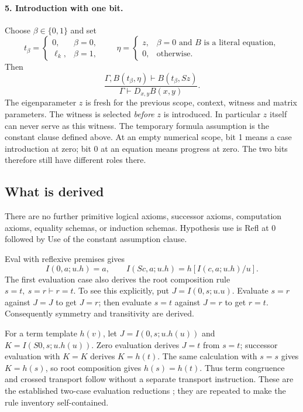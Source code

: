 \documentclass[11pt,letterpaper]{article}
\theoremstyle{definition}
\theoremstyle{remark}
\begin{document}
\paragraph{5. Introduction with one bit.}
Choose $\beta\in\{0,1\}$ and set
\[
 t_\beta=\begin{cases}0,&\beta=0,\\\ell_k,&\beta=1,\end{cases}
 \qquad
 \eta=\begin{cases}
 z,&\beta=0\text{ and }B\text{ is a literal equation},\\
 0,&\text{otherwise}.
 \end{cases}
\]
Then
\[
 \frac{\Gamma,B(t_\beta,\eta)\vdash B(t_\beta,Sz)}
      {\Gamma\vdash D_{x,y}B(x,y)}.
 \tag{Bit-DI}
\]
The eigenparameter $z$ is fresh for the previous scope, context, witness
and matrix parameters. The witness is selected \emph{before} $z$ is
introduced. In particular $z$ itself can never serve as this witness.
The temporary formula assumption is the constant clause defined above.
At an empty numerical scope, bit 1 means a case introduction at zero;
bit 0 at an equation means progress at zero. The two bits therefore still
have different roles there.

\subsection{What is derived}

There are no further primitive logical axioms, successor axioms,
computation axioms, equality schemas, or induction schemas. Hypothesis
use is Refl at $0$ followed by Use of the constant assumption clause.

Eval with reflexive premises gives
\[
 I(0,a;u.h)=a,\qquad I(Sc,a;u.h)=h[I(c,a;u.h)/u].
\]
The first evaluation case also derives the root composition rule
$s=t,\ s=r\vdash r=t$. To see this explicitly, put
$J=I(0,s;u.u)$. Evaluate $s=r$ against $J=J$ to get $J=r$;
then evaluate $s=t$ against $J=r$ to get $r=t$.
Consequently symmetry and transitivity are derived.

For a term template $h(v)$, let
$J=I(0,s;u.h(u))$ and $K=I(S0,s;u.h(u))$.
Zero evaluation derives $J=t$ from $s=t$; successor evaluation with
$K=K$ derives $K=h(t)$. The same calculation with $s=s$ gives
$K=h(s)$, so root composition gives $h(s)=h(t)$. Thus term
congruence and crossed transport follow without a separate transport
instruction. These are the established two-case evaluation reductions
\cite{rootfree,evallean}; they are repeated to make the rule inventory
self-contained.
\end{document}
